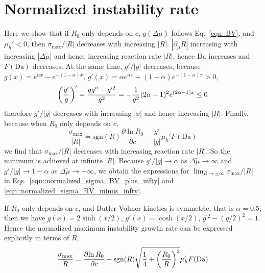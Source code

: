 \documentclass[reprint,aps,pre,superscriptaddress]{revtex4-2}
\newcommand{\pderiv}[2]{\frac{\partial {#1}}{\partial {#2}}}
\let\originalleft\left
\let\originalright\right
\renewcommand{\left}{\mathopen{}\mathclose\bgroup\originalleft}
\renewcommand{\right}{\aftergroup\egroup\originalright}
\begin{document}
\section{Normalized instability rate}
\label{appendix::norm_instability}
Here we show that if $R_0$ only depends on $c$, $g(\Delta \tilde{\mu})$ follows Eq.~\ref{eqn::BV}, and $\mu_h'<0$, then $\sigma_\text{max}/|R|$ decreases with increasing $|R|$.
$|\partial_{\tilde{\mu}} R|$ increasing with increasing $|\Delta \tilde{\mu}|$ and hence increasing reaction rate $|R|$, hence $\text{Da}$ increases and $F(\text{Da})$ decreases. At the same time, $g'/|g|$ decreases,
because $g(x)=e^{\alpha x}-e^{-(1-\alpha)x}$, $g'(x) = \alpha e^{\alpha x}+(1-\alpha)e^{-(1-\alpha)x}>0$,
\begin{equation}
  \left( \frac{g'}{g} \right)' = \frac{gg'' -g^{\prime2}}{g^2} = - \frac{1}{g^2} (2\alpha-1)^2 e^{(2\alpha-1)x}  \leq 0
\end{equation}
therefore $g'/|g|$ decreases with increasing $|x|$ and hence increasing $|R|$.
Finally, because when $R_0$ only depends on $c$,
\begin{equation}
  \frac{\sigma_\text{max}}{|R|} = \text{sgn}(R) \pderiv{\ln{R_0}}{c} - \frac{g'}{|g|} \mu_h' F(\text{Da})
\end{equation}
we find that $\sigma_\text{max}/|R|$ decreases with increasing reaction rate $|R|$. So the minimum is achieved at infinite $|R|$.
Because $g'/|g| \to \alpha$ as $\Delta \tilde{\mu} \to \infty$ and $g'/|g| \to 1-\alpha$ as $\Delta \tilde{\mu} \to -\infty$, we obtain the expressions for $\lim_{R\to \pm \infty}{\sigma_\text{max}/|R|}$ in Eqs.~\ref{eqn::normalized_sigma_BV_plus_infty} and \ref{eqn::normalized_sigma_BV_minus_infty}.

If $R_0$ only depends on $c$, and Butler-Volmer kinetics is symmetric, that is $\alpha=0.5$, then we have $g(x)=2\sinh{(x/2)}$, $g'(x)=\cosh{(x/2)}$, $g^{\prime2} - (g/2)^2 = 1$.
Hence the normalized maximum instability growth rate can be expressed explicitly in terms of $R$,
\begin{equation} \label{eqn::normalized_sigma_BV}
  \frac{\sigma_\text{max}}{R} =  \pderiv{\ln{R_0}}{c}  -  \text{sgn}(R) \sqrt{\frac{1}{4}+\left(\frac{R_0}{R}\right)^2} \mu_h' F(\text{Da})
\end{equation}

\end{document}
